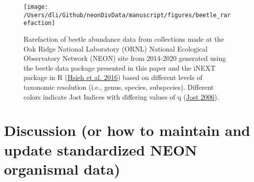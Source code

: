 \documentclass[
  12pt,
]{article}
\begin{document}
\begin{figure}

{\centering \texttt{[image: /Users/dli/Github/neonDivData/manuscript/figures/beetle\_rarefaction]} 

}

\caption{Rarefaction of beetle abundance data from collections made at the Oak Ridge National Laboratory (ORNL) National Ecological Observatory Network (NEON) site from 2014-2020 generated using the beetle data package presented in this paper and the iNEXT package in R (\protect\hyperlink{ref-hsieh2016inext}{Hsieh et al. 2016}) based on different levels of taxonomic resolution (i.e., genus, species, subspecies). Different colors indicate Jost Indices with differing values of q (\protect\hyperlink{ref-jost2006entropy}{Jost 2006}).}\label{fig:Fig3Curve}
\end{figure}

\hypertarget{discussion-or-how-to-maintain-and-update-standardized-neon-organismal-data}{%
\section{Discussion (or how to maintain and update standardized NEON organismal data)}\label{discussion-or-how-to-maintain-and-update-standardized-neon-organismal-data}}
\end{document}
